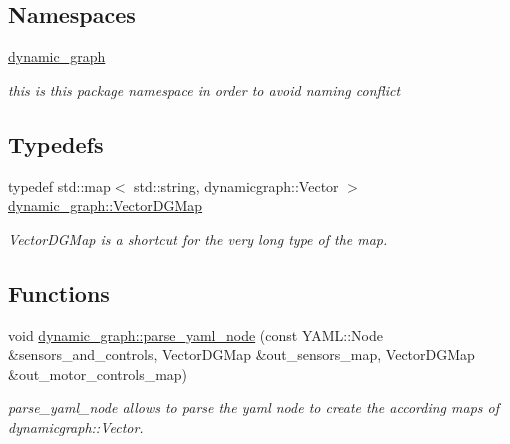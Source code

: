 \subsection*{Namespaces}
\begin{DoxyCompactItemize}
\item 
 \hyperlink{namespacedynamic__graph}{dynamic\+\_\+graph}
\begin{DoxyCompactList}\small\item\em this is this package namespace in order to avoid naming conflict \end{DoxyCompactList}\end{DoxyCompactItemize}
\subsection*{Typedefs}
\begin{DoxyCompactItemize}
\item 
typedef std\+::map$<$ std\+::string, dynamicgraph\+::\+Vector $>$ \hyperlink{namespacedynamic__graph_a51212ed7fa4ae81e7b362a27f09b7ab8}{dynamic\+\_\+graph\+::\+Vector\+D\+G\+Map}\hypertarget{namespacedynamic__graph_a51212ed7fa4ae81e7b362a27f09b7ab8}{}\label{namespacedynamic__graph_a51212ed7fa4ae81e7b362a27f09b7ab8}

\begin{DoxyCompactList}\small\item\em Vector\+D\+G\+Map is a shortcut for the very long type of the map. \end{DoxyCompactList}\end{DoxyCompactItemize}
\subsection*{Functions}
\begin{DoxyCompactItemize}
\item 
void \hyperlink{namespacedynamic__graph_a3473e2d5502f8a2bff6b43cbc2d35e07}{dynamic\+\_\+graph\+::parse\+\_\+yaml\+\_\+node} (const Y\+A\+M\+L\+::\+Node \&sensors\+\_\+and\+\_\+controls, Vector\+D\+G\+Map \&out\+\_\+sensors\+\_\+map, Vector\+D\+G\+Map \&out\+\_\+motor\+\_\+controls\+\_\+map)
\begin{DoxyCompactList}\small\item\em parse\+\_\+yaml\+\_\+node allows to parse the yaml node to create the according maps of dynamicgraph\+::\+Vector. \end{DoxyCompactList}\end{DoxyCompactItemize}


